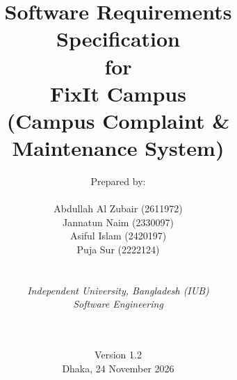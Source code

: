 
\def\Company{Consultancy}
\def\Institute{\textit{Independent University, Bangladesh (IUB)}}
\def\Course{\textit{Software Engineering}}
\def\Module{\textit{ }}
\def\Docent{\textit{}}
\def\Assistant{\textit{}}

\def\BoldTitle{Software Requirements Specification}

\def\Subtitle{for \\ FixIt Campus \\ {\large (Campus Complaint \& Maintenance System)} \\}
\def\Authors{Prepared by:\\\\ Abdullah Al Zubair (2611972) \\ Jannatun Naim (2330097) \\ Asiful Islam (2420197) \\ Puja Sur (2222124) } 


\title{\textbf{\BoldTitle}\\\Subtitle}
\author{\Authors \\ \\ \\ \Institute\\ \Course\\ \Module\\ \Docent\\ \Assistant}
\date{Version 1.2 \\ Dhaka, 24 November 2026}

